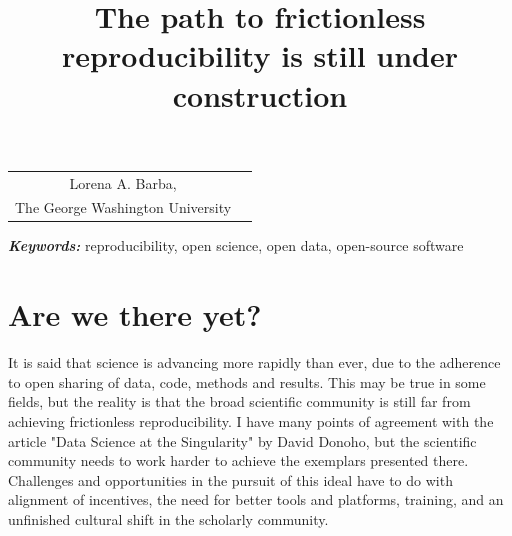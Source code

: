 \documentclass[]{hdsr}
\begin{document}




\begin{center}

  \title{The path to frictionless reproducibility is still under construction}
  \maketitle

  \thispagestyle{empty}
  
  \vspace*{.2in}

  \begin{tabular}{cc}
    Lorena A. Barba\upstairs{\affilone,*},
   \\[0.25ex]
   {\small \upstairs{\affilone} The George Washington University} \\
  \end{tabular}
  
  \vspace*{0.4in}

\end{center}

\vspace*{0.15in}
\hspace{10pt}
  \small	
  \textbf{\textit{Keywords: }} {reproducibility, open science, open data, open-source software}
  
\copyrightnotice

\section*{Are we there yet?}

It is said that science is advancing more rapidly than ever, due to the adherence to open sharing of data, code, methods and results. This may be true in some fields, but the reality is that the broad scientific community is still far from achieving frictionless reproducibility. I have many points of agreement with the article "Data Science at the Singularity" by David Donoho, but the scientific community needs to work harder to achieve the exemplars presented there. Challenges and opportunities in the pursuit of this ideal have to do with alignment of incentives, the need for better tools and platforms, training, and an unfinished cultural shift in the scholarly community.
\end{document}
